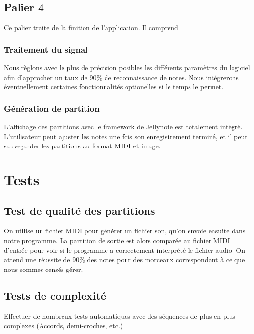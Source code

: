\documentclass[12pt]{article}
\begin{document}
\newpage
\subsection{Palier 4}

Ce palier traite de la finition de l'application. Il comprend \\

\subsubsection{Traitement du signal}

Nous règlons avec le plus de précision posibles les différents paramètres du logiciel afin d'approcher un taux de 90\% de reconnaissance de notes. Nous intégrerons éventuellement certaines fonctionnalités optionelles si le temps le permet.

\subsubsection{Génération de partition}

L'affichage des partitions avec le framework de Jellynote est totalement intégré. L'utilisateur peut ajuster les notes une fois son enregistrement terminé, et il peut sauvegarder les partitions au format MIDI et image.


\newpage
\section{Tests}

\subsection{Test de qualité des partitions}
On utilise un fichier MIDI pour générer un fichier son, qu’on envoie ensuite dans notre programme. La partition de sortie est alors comparée au fichier MIDI d’entrée pour voir si le programme a correctement interprété le fichier audio. On attend une réussite de 90\% des notes pour des morceaux correspondant à ce que nous sommes censés gérer.\\


\subsection{Tests de complexité}
Effectuer de nombreux tests automatiques avec des séquences de plus en plus complexes (Accords, demi-croches, etc.)\\
\end{document}

